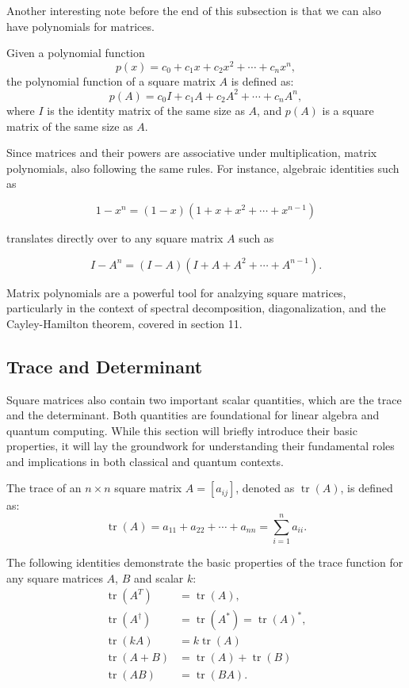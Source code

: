 \documentclass[12pt]{article}
\begin{document}
Another interesting note before the end of this subsection is that we can also have polynomials for matrices. 

\begin{definition}
    Given a polynomial function
    \[
        p(x) = c_{0} + c_{1}x + c_{2}x^{2} + \cdots + c_{n}x^{n},
    \]
    the polynomial function of a square matrix $A$ is defined as:
    \[
        p(A) = c_{0}I + c_{1}A + c_{2}A^{2} + \cdots + c_{n}A^{n},
    \]
    where $I$ is the identity matrix of the same size as $A$, and $p(A)$ is a square matrix of the same size as $A$.
\end{definition}

Since matrices and their powers are associative under multiplication, matrix polynomials, also following the same rules. For instance, algebraic identities such as 

$$1 - x^{n} = (1 - x)(1 + x + x^{2} + \cdots + x^{n-1})$$

translates directly over to any square matrix $A$ such as 

$$I - A^{n} = (I - A)(I + A + A^{2} + \cdots + A^{n-1}).$$

Matrix polynomials are a powerful tool for analzying square matrices, particularly in the context of spectral decomposition, diagonalization, and the Cayley-Hamilton theorem, covered in section 11. 

\subsection{Trace and Determinant}

Square matrices also contain two important scalar quantities, which are the trace and the determinant. Both quantities are foundational for linear algebra and quantum computing. While this section will briefly introduce their basic properties, it will lay the groundwork for understanding their fundamental roles and implications in both classical and quantum contexts. 

\begin{definition}[Trace]
    The trace of an $n \times n$ square matrix $A = [a_{ij}]$, denoted as $\operatorname{tr}(A)$, is defined as:
    \[
        \operatorname{tr}(A) = a_{11} + a_{22} + \cdots + a_{nn} = \sum_{i=1}^{n} a_{ii}.
    \]
\end{definition}

\begin{theorem}
    The following identities demonstrate the basic properties of the trace function for any square matrices $A$, $B$ and scalar $k$:
    \begin{align*}
        \operatorname{tr}(A^{T}) &= \operatorname{tr}(A),\\
        \operatorname{tr}(A^{\dagger}) &= \operatorname{tr}(A^{*}) = \operatorname{tr}(A)^{*},\\
        \operatorname{tr}(kA) &= k \operatorname{tr}(A) \\
        \operatorname{tr}(A + B) &= \operatorname{tr}(A) + \operatorname{tr}(B)\\
        \operatorname{tr}(AB) &= \operatorname{tr}(BA).
    \end{align*}
\end{theorem}
\end{document}
